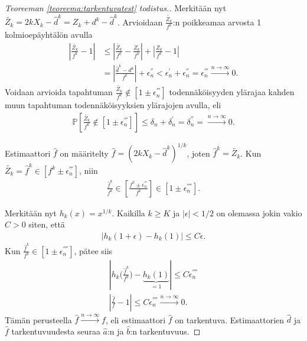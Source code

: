 \documentclass[finnish,12pt,a4paper,pdftex,sci,utf8]{aaltothesis}
\begin{document}
\begin{proof}[Teoreeman \ref{teoreema:tarkentuvatest} todistus.]
	Merkitään nyt $\tilde{Z_k} = 2kX_k - \hat{d}^k = Z_k + d^k - \hat{d}^k$. Arvioidaan $\frac{\tilde{Z_k}}{f^k}$:n poikkeamaa arvosta 1 kolmioepäyhtälön avulla 
	\begin{align*}
		|\frac{\tilde{Z_k}}{f^k} - 1| &\leq |\frac{\tilde{Z_k}}{f^k} - \frac{Z_k}{f^k}| + |\frac{Z_k}{f^k} - 1| \\
		& = |\frac{\hat{d}^k - d^k}{f^k}| + \epsilon_{n}^{''} < \epsilon_{n}^{'} + \epsilon_{n}^{''} = \epsilon_{n}^{'''} \xrightarrow{n \rightarrow \infty} 0.
	\end{align*}
	Voidaan arvioida tapahtuman $\frac{\tilde{Z_k}}{f^k} \notin [1 \pm \epsilon_{n}^{'''}]$ todennäköisyyden ylärajaa kahden muun tapahtuman todennäköisyyksien ylärajojen avulla, eli
	\begin{align*}
		\mathbb{P}[\frac{\tilde{Z_k}}{f^k} \notin [1 \pm \epsilon_{n}^{'''}]] \leq \delta_{n} + \delta_{n}^{'} = \delta_{n}^{''} = \xrightarrow{n \rightarrow \infty} 0.
	\end{align*}

	Estimaattori $\hat{f}$ on määritelty $\hat{f} = (2kX_k - \hat{d}^k)^{1/k}$, joten $\hat{f}^k = \tilde{Z_k}$. Kun \\ $\tilde{Z_k} = \hat{f}^k \in [f^k \pm \epsilon_{n}^{'''}]$, niin 
	\begin{align*}
		\frac{\hat{f}^k}{f^k} \in [\frac{{f}^k \pm \epsilon_{n}^{'''}}{f^k}] \in [1 \pm \epsilon_{n}^{''''}].
	\end{align*}

	Merkitään nyt $h_k(x) = x^{1/k}$. Kaikilla $k \geq K$ ja $|\epsilon| < 1/2$ on olemassa jokin vakio $C > 0$ siten, että
	\begin{align*}
		|h_k(1+\epsilon) - h_k(1)| \leq C \epsilon.
	\end{align*}
	Kun $\frac{\hat{f}^k}{f^k} \in [1 \pm \epsilon_{n}^{''''}]$, pätee siis
	\begin{align*}
		|h_k \big(\frac{\hat{f}^k}{f^k} \big) - \underbrace{h_k(1)}_{= 1} | \leq C \epsilon_{n}^{''''} \\
		|\frac{\hat{f}}{f} - 1| \leq C \epsilon_{n}^{''''} \xrightarrow{n \rightarrow \infty} 0.
	\end{align*}
	Tämän perusteella $\hat{f} \xrightarrow{n \rightarrow \infty} f$, eli estimaattori $\hat{f}$ on tarkentuva. 
	Estimaattorien $\hat{d}$ ja$\hat{f}$ tarkentuvuudesta seuraa $\hat{a}$:n ja $\hat{b}$:n tarkentuvuus.

\end{proof}
\end{document}
